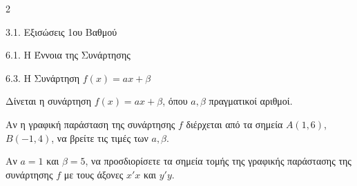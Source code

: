 \begin{ylh}{2}
    \item 3.1. Εξισώσεις 1ου Βαθμού
    \item 6.1. Η Έννοια της Συνάρτησης
    \item 6.3. Η Συνάρτηση $f(x)=ax+\beta$
\end{ylh}
Δίνεται η συνάρτηση $f(x) = a x + \beta$, όπου $a, \beta$ πραγματικοί αριθμοί.
\begin{alist}
\item Αν η γραφική παράσταση της συνάρτησης $f$ διέρχεται από τα σημεία ${A}(1, 6)$, ${B}(-1, 4)$, να βρείτε τις τιμές των $a, \beta$.
\item Αν $a = 1$ και $\beta = 5$, να προσδιορίσετε τα σημεία τομής της γραφικής παράστασης της συνάρτησης $f$ με τους άξονες $x'x$ και $y'y$.

\end{alist}

